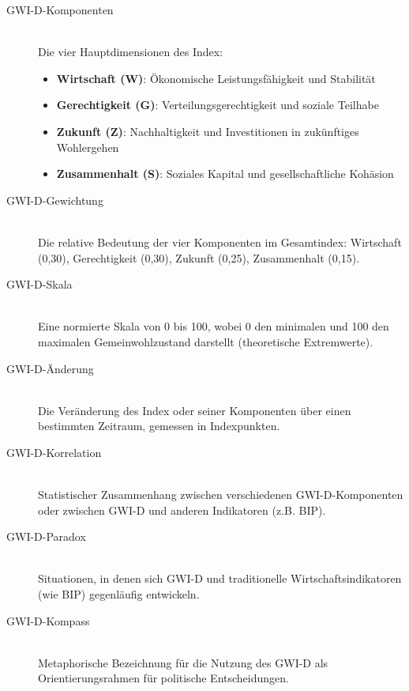 \begin{description}
    \item[GWI-D-Komponenten] \hfill \\
    Die vier Hauptdimensionen des Index:
    \begin{itemize}
        \item \textbf{Wirtschaft (W)}: Ökonomische Leistungsfähigkeit und Stabilität
        \item \textbf{Gerechtigkeit (G)}: Verteilungsgerechtigkeit und soziale Teilhabe
        \item \textbf{Zukunft (Z)}: Nachhaltigkeit und Investitionen in zukünftiges Wohlergehen
        \item \textbf{Zusammenhalt (S)}: Soziales Kapital und gesellschaftliche Kohäsion
    \end{itemize}
    
    \item[GWI-D-Gewichtung] \hfill \\
    Die relative Bedeutung der vier Komponenten im Gesamtindex: Wirtschaft (0,30), Gerechtigkeit (0,30), Zukunft (0,25), Zusammenhalt (0,15).
    
    \item[GWI-D-Skala] \hfill \\
    Eine normierte Skala von 0 bis 100, wobei 0 den minimalen und 100 den maximalen Gemeinwohlzustand darstellt (theoretische Extremwerte).
    
    \item[GWI-D-Änderung] \hfill \\
    Die Veränderung des Index oder seiner Komponenten über einen bestimmten Zeitraum, gemessen in Indexpunkten.
    
    \item[GWI-D-Korrelation] \hfill \\
    Statistischer Zusammenhang zwischen verschiedenen GWI-D-Komponenten oder zwischen GWI-D und anderen Indikatoren (z.B. BIP).
    
    \item[GWI-D-Paradox] \hfill \\
    Situationen, in denen sich GWI-D und traditionelle Wirtschaftsindikatoren (wie BIP) gegenläufig entwickeln.
    
    \item[GWI-D-Kompass] \hfill \\
    Metaphorische Bezeichnung für die Nutzung des GWI-D als Orientierungsrahmen für politische Entscheidungen.
\end{description}

